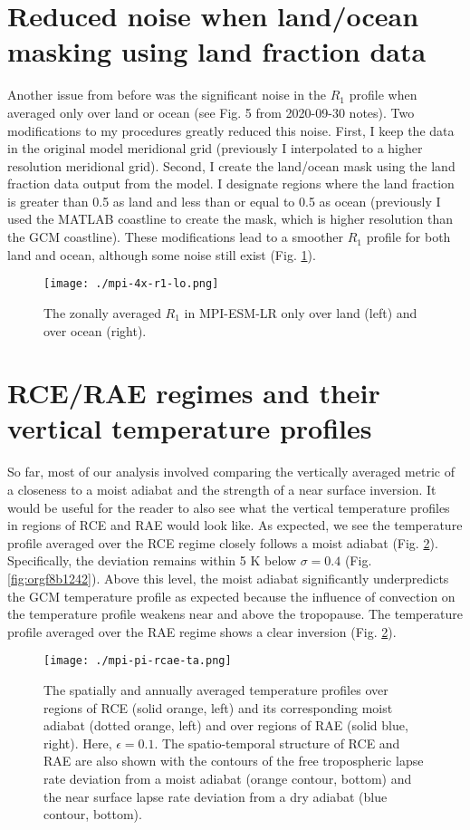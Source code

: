 \documentclass[11pt]{article}
\begin{document}
\section{Reduced noise when land/ocean masking using land fraction data}
\label{sec:org400d5ac}
Another issue from before was the significant noise in the \(R_1\) profile when averaged only over land or ocean (see Fig. 5 from 2020-09-30 notes). Two modifications to my procedures greatly reduced this noise. First, I keep the data in the original model meridional grid (previously I interpolated to a higher resolution meridional grid). Second, I create the land/ocean mask using the land fraction data output from the model. I designate regions where the land fraction is greater than 0.5 as land and less than or equal to 0.5 as ocean (previously I used the MATLAB coastline to create the mask, which is higher resolution than the GCM coastline). These modifications lead to a smoother \(R_1\) profile for both land and ocean, although some noise still exist (Fig. \ref{fig:org971932c}).

\begin{figure}[htbp]
\centering
\texttt{[image: ./mpi-4x-r1-lo.png]}
\caption{\label{fig:org971932c}The zonally averaged \(R_1\) in MPI-ESM-LR only over land (left) and over ocean (right).}
\end{figure}

\section{RCE/RAE regimes and their vertical temperature profiles}
\label{sec:orgd230268}
So far, most of our analysis involved comparing the vertically averaged metric of a closeness to a moist adiabat and the strength of a near surface inversion. It would be useful for the reader to also see what the vertical temperature profiles in regions of RCE and RAE would look like. As expected, we see the temperature profile averaged over the RCE regime closely follows a moist adiabat (Fig. \ref{fig:org3ad0158}). Specifically, the deviation remains within 5 K below \(\sigma=0.4\) (Fig. \ref{fig:orgf8b1242}). Above this level, the moist adiabat significantly underpredicts the GCM temperature profile as expected because the influence of convection on the temperature profile weakens near and above the tropopause. The temperature profile averaged over the RAE regime shows a clear inversion (Fig. \ref{fig:org3ad0158}).

\begin{figure}[htbp]
\centering
\texttt{[image: ./mpi-pi-rcae-ta.png]}
\caption{\label{fig:org3ad0158}The spatially and annually averaged temperature profiles over regions of RCE (solid orange, left) and its corresponding moist adiabat (dotted orange, left) and over regions of RAE (solid blue, right). Here, \(\epsilon=0.1\). The spatio-temporal structure of RCE and RAE are also shown with the contours of the free tropospheric lapse rate deviation from a moist adiabat (orange contour, bottom) and the near surface lapse rate deviation from a dry adiabat (blue contour, bottom).}
\end{figure}
\end{document}
